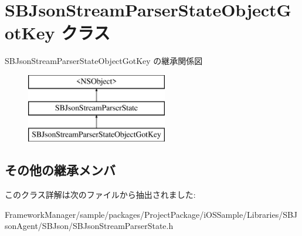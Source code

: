 \hypertarget{interface_s_b_json_stream_parser_state_object_got_key}{}\section{S\+B\+Json\+Stream\+Parser\+State\+Object\+Got\+Key クラス}
\label{interface_s_b_json_stream_parser_state_object_got_key}
S\+B\+Json\+Stream\+Parser\+State\+Object\+Got\+Key の継承関係図\begin{figure}[H]
\begin{center}
\leavevmode
\includegraphics[height=3.000000cm]{interface_s_b_json_stream_parser_state_object_got_key}
\end{center}
\end{figure}
\subsection*{その他の継承メンバ}


このクラス詳解は次のファイルから抽出されました\+:\begin{DoxyCompactItemize}
\item 
Framework\+Manager/sample/packages/\+Project\+Package/i\+O\+S\+Sample/\+Libraries/\+S\+B\+Json\+Agent/\+S\+B\+Json/S\+B\+Json\+Stream\+Parser\+State.\+h\end{DoxyCompactItemize}
